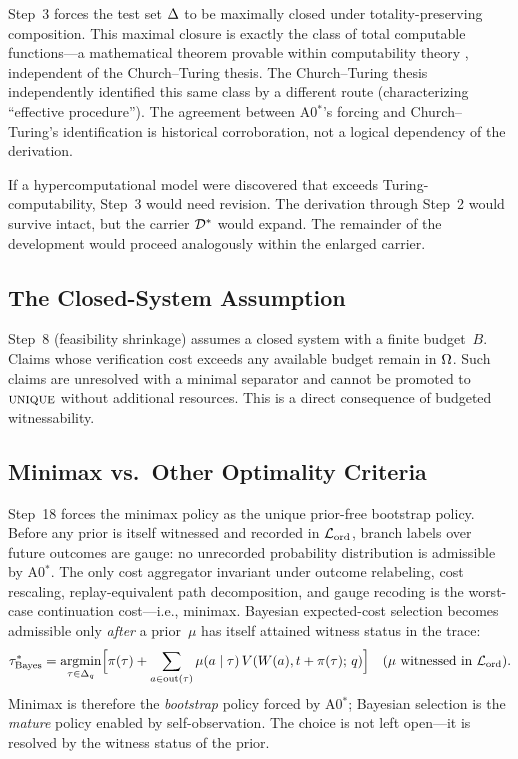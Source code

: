 Step~3 forces the test set $\Delta$ to be maximally closed under
totality-preserving composition.  This maximal closure is exactly the
class of total computable functions---a mathematical theorem provable
within computability theory \citep{rogers1967}, independent of the
Church--Turing thesis.  The Church--Turing thesis
\citep{church1936, turing1936} independently identified this same class
by a different route (characterizing ``effective procedure'').  The
agreement between A0$^*$'s forcing and Church--Turing's identification is
historical corroboration, not a logical dependency of the derivation.

\begin{remark}
If a hypercomputational model were discovered that exceeds
Turing-computability, Step~3 would need revision. The derivation
through Step~2 would survive intact, but the carrier $\mathcal{D}^*$ would
expand. The remainder of the development would proceed analogously within the
enlarged carrier.
\end{remark}

\subsection{The Closed-System Assumption}
\label{sec:discussion:closed}

Step~8 (feasibility shrinkage) assumes a closed system with a finite
budget~$B$. Claims whose verification cost exceeds any available budget
remain in $\Omega$. Such claims are unresolved with
a minimal separator and cannot be promoted to $\textsc{unique}$ without
additional resources. This is a direct consequence of budgeted witnessability.

\subsection{Minimax vs.\ Other Optimality Criteria}
\label{sec:discussion:minimax}

Step~18 forces the minimax policy as the unique prior-free bootstrap
policy.  Before any prior is itself witnessed and recorded in
$\mathcal{L}_{\mathrm{ord}}$, branch labels over future outcomes are gauge: no unrecorded
probability distribution is admissible by A0$^*$.  The only cost aggregator
invariant under outcome relabeling, cost rescaling, replay-equivalent path
decomposition, and gauge recoding is the worst-case continuation
cost---i.e., minimax.  Bayesian expected-cost selection becomes admissible
only \emph{after} a prior~$\mu$ has itself attained witness status in the
trace:
\[
  \tau^*_{\mathrm{Bayes}} = \argmin_{\tau \in \Del_q}
    \Bigl[\pi(\tau) + \sum_{a \in \mathrm{out}(\tau)} \mu(a \mid \tau)\, V(\fiber{a}, t + \pi(\tau);\, q)\Bigr]
    \quad(\mu \text{ witnessed in } \OrdLedger).
\]
Minimax is therefore the \emph{bootstrap} policy forced by A0$^*$;
Bayesian selection is the \emph{mature} policy enabled by
self-observation.  The choice is not left open---it is resolved by the
witness status of the prior.

